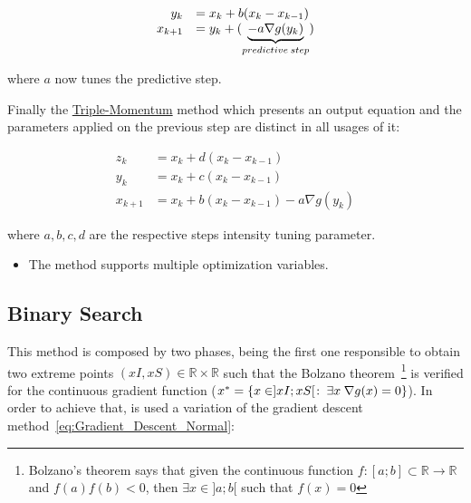\begin{equation}
    \begin{array}{rl}
      y_k &=  x_k + b (x_k - x_{k-1})  \\
      x_{k+1} &= y_k + (\underbrace{- a \nabla g(y_k)}_{predictive  \hspace{0.2em}step})
    \end{array}
    \label{eq:Gradient_Descent_Nesterov}
\end{equation}

where \(a\) now tunes the predictive step. \par

Finally the \underline{Triple-Momentum} method which presents an output equation and the parameters applied on the previous step are distinct in all usages of it:

\begin{equation}
    \begin{array}{rl}
      z_k &= x_k + d (x_k - x_{k-1}) \\
      y_k &=  x_k + c (x_k - x_{k-1})  \\
      x_{k+1} &= x_k + b(x_k - x_{k-1}) - a \nabla g(y_k)
    \end{array}
    \label{eq:Gradient_Triple_Momentum}
\end{equation}

where \(a, b, c, d\) are the respective steps intensity tuning parameter. \\




\begin{tcolorbox}[colback=blue!5!white,colframe=blue!35!white,title=Notes:]
\begin{itemize}
    \item The method supports multiple optimization variables.
\end{itemize}
\end{tcolorbox} 







\newpage %


\subsection{Binary Search}
\label{subsec:Binary_Search}

This method is composed by two phases, being  the first one responsible to obtain two extreme points \((xI,xS) \in \mathbb{R} \times \mathbb{R}\) such that the Bolzano theorem~\footnote{Bolzano's theorem says that given the continuous function \(f:[a;b] \subset \mathbb{R} \to \mathbb{R}\) and \(f(a)f(b) < 0\), then \(\exists x \in  ]a; b[\) such that \(f(x) = 0\)} is verified for the continuous gradient function (\(  x^*= \{ x \in ]xI; xS[ \hspace{0.1em}  : \hspace{0.25em} \exists x \hspace{0.25em}\nabla g(x) = 0 \} \)). In order to achieve that, is used a variation of the gradient descent method~\ref{eq:Gradient_Descent_Normal}:

